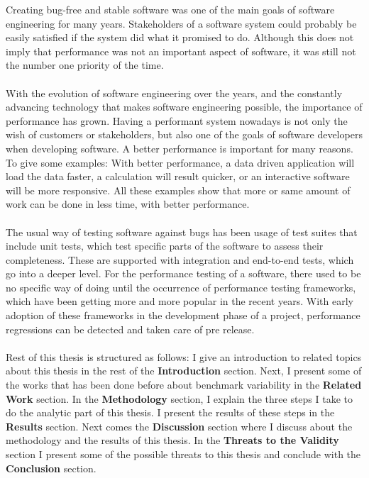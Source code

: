 \documentclass{seal_thesis}
\begin{document}
Creating bug-free and stable software was one of the main goals of software engineering for many years. Stakeholders of a software system could probably be easily satisfied if the system did what it promised to do. Although this does not imply that performance was not an important aspect of software, it was still not the number one priority of the time.\\
\\
With the evolution of software engineering over the years, and the constantly advancing technology that makes software engineering possible, the importance of performance has grown. Having a performant system nowadays is not only the wish of customers or stakeholders, but also one of the goals of software developers when developing software. A better performance is important for many reasons. To give some examples: With better performance, a data driven application  will load the data faster, a calculation will result quicker, or an interactive software will be more responsive. All these examples show that more or same amount of work can be done in less time, with better performance.\\
\\
The usual way of testing software against bugs has been usage of test suites that include unit tests, which test specific parts of the software to assess their completeness. These are supported with integration and end-to-end tests, which go into a deeper level. For the performance testing of a software, there used to be no specific way of doing until the occurrence of performance testing frameworks, which have been getting more and more popular in the recent years. With early adoption of these frameworks in the development phase of a project, performance regressions can be detected and taken care of pre release.\\
\\
Rest of this thesis is structured as follows: I give an introduction to related topics about this thesis in the rest of the \textbf{Introduction} section. Next, I present some of the works that has been done before about benchmark variability in the \textbf{Related Work} section. In the \textbf{Methodology} section, I explain the three steps I take to do the analytic part of this thesis. I present the results of these steps in the \textbf{Results} section. Next comes the \textbf{Discussion} section where I discuss about the methodology and the results of this thesis. In the \textbf{Threats to the Validity} section I present some of the possible threats to this thesis and conclude with the \textbf{Conclusion} section.
\end{document}
